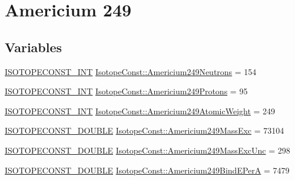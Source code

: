 \hypertarget{group___isotope_const-_americium-_am249}{}\section{Americium 249}
\label{group___isotope_const-_americium-_am249}
\subsection*{Variables}
\begin{DoxyCompactItemize}
\item 
\mbox{\hyperlink{group___isotope_const-_macros_ga5f18360b3e99483a35c32d789e62621c}{I\+S\+O\+T\+O\+P\+E\+C\+O\+N\+S\+T\+\_\+\+I\+NT}} \mbox{\hyperlink{group___isotope_const-_americium-_am249_ga68ec736a7a0d524a2e426b0d6ae23915}{Isotope\+Const\+::\+Americium249\+Neutrons}} = 154
\item 
\mbox{\hyperlink{group___isotope_const-_macros_ga5f18360b3e99483a35c32d789e62621c}{I\+S\+O\+T\+O\+P\+E\+C\+O\+N\+S\+T\+\_\+\+I\+NT}} \mbox{\hyperlink{group___isotope_const-_americium-_am249_ga50b6388c6b5a968d3c5f1e6560a71ae2}{Isotope\+Const\+::\+Americium249\+Protons}} = 95
\item 
\mbox{\hyperlink{group___isotope_const-_macros_ga5f18360b3e99483a35c32d789e62621c}{I\+S\+O\+T\+O\+P\+E\+C\+O\+N\+S\+T\+\_\+\+I\+NT}} \mbox{\hyperlink{group___isotope_const-_americium-_am249_ga90484d532dc5cfd1f79ecb9f25460d8e}{Isotope\+Const\+::\+Americium249\+Atomic\+Weight}} = 249
\item 
\mbox{\hyperlink{group___isotope_const-_macros_ga8f45a7272ce02c0b4c65c44636ed719a}{I\+S\+O\+T\+O\+P\+E\+C\+O\+N\+S\+T\+\_\+\+D\+O\+U\+B\+LE}} \mbox{\hyperlink{group___isotope_const-_americium-_am249_gaf752a3eca9074bf1b992f0ebeb33f4ce}{Isotope\+Const\+::\+Americium249\+Mass\+Exc}} = 73104
\item 
\mbox{\hyperlink{group___isotope_const-_macros_ga8f45a7272ce02c0b4c65c44636ed719a}{I\+S\+O\+T\+O\+P\+E\+C\+O\+N\+S\+T\+\_\+\+D\+O\+U\+B\+LE}} \mbox{\hyperlink{group___isotope_const-_americium-_am249_ga02592386f27f06aef273f4f668b6b7e6}{Isotope\+Const\+::\+Americium249\+Mass\+Exc\+Unc}} = 298
\item 
\mbox{\hyperlink{group___isotope_const-_macros_ga8f45a7272ce02c0b4c65c44636ed719a}{I\+S\+O\+T\+O\+P\+E\+C\+O\+N\+S\+T\+\_\+\+D\+O\+U\+B\+LE}} \mbox{\hyperlink{group___isotope_const-_americium-_am249_ga1479037758f6b76273068c9456b442ae}{Isotope\+Const\+::\+Americium249\+Bind\+E\+PerA}} = 7479
\item 

\end{DoxyCompactItemize}
